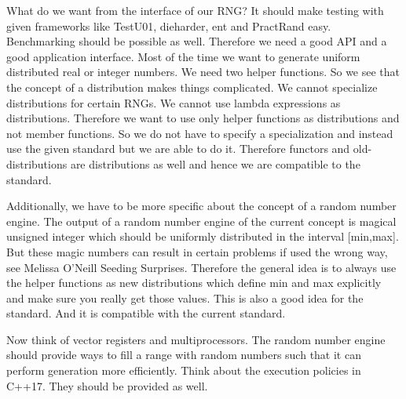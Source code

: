 \documentclass{stdlocal}
\begin{document}
  What do we want from the interface of our RNG?
  It should make testing with given frameworks like TestU01, dieharder, ent and PractRand easy.
  Benchmarking should be possible as well.
  Therefore we need a good API and a good application interface.
  Most of the time we want to generate uniform distributed real or integer numbers.
  We need two helper functions.
  So we see that the concept of a distribution makes things complicated.
  We cannot specialize distributions for certain RNGs.
  We cannot use lambda expressions as distributions.
  Therefore we want to use only helper functions as distributions and not member functions.
  So we do not have to specify a specialization and instead use the given standard but we are able to do it.
  Therefore functors and old-distributions are distributions as well and hence we are compatible to the standard.

  Additionally, we have to be more specific about the concept of a random number engine.
  The output of a random number engine of the current concept is magical unsigned integer which should be uniformly distributed in the interval [min,max].
  But these magic numbers can result in certain problems if used the wrong way, see Melissa O'Neill Seeding Surprises.
  Therefore the general idea is to always use the helper functions as new distributions which define min and max explicitly and make sure you really get those values.
  This is also a good idea for the standard.
  And it is compatible with the current standard.

  Now think of vector registers and multiprocessors.
  The random number engine should provide ways to fill a range with random numbers such that it can perform generation more efficiently.
  Think about the execution policies in C++17.
  They should be provided as well.
\end{document}

